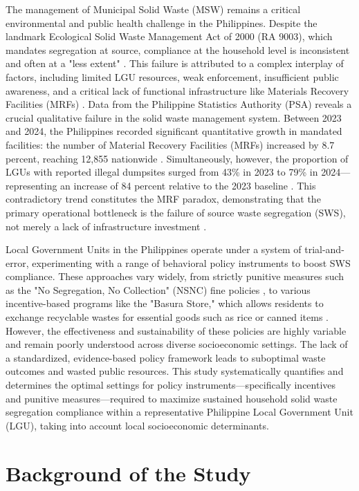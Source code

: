 The management of Municipal Solid Waste (MSW) remains a critical environmental and public health challenge in the Philippines. Despite the landmark Ecological Solid Waste Management Act of 2000 (RA 9003), which mandates segregation at source, compliance at the household level is inconsistent and often at a "less extent" \citep{Carpio2025}. This failure is attributed to a complex interplay of factors, including limited LGU resources, weak enforcement, insufficient public awareness, and a critical lack of functional infrastructure like Materials Recovery Facilities (MRFs) \citep{Espino2025}. Data from the Philippine Statistics Authority (PSA) reveals a crucial qualitative failure in the solid waste management system. Between 2023 and 2024, the Philippines recorded significant quantitative growth in mandated facilities: the number of Material Recovery Facilities (MRFs) increased by 8.7 percent, reaching 12,855 nationwide \citep{PSA2024}. Simultaneously, however, the proportion of LGUs with reported illegal dumpsites surged from 43\% in 2023 to 79\% in 2024—representing an increase of 84 percent relative to the 2023 baseline \citep{PSA2024}. This contradictory trend constitutes the MRF paradox, demonstrating that the primary operational bottleneck is the failure of source waste segregation (SWS), not merely a lack of infrastructure investment \citep{Carpio2025, WorldBank2022}.

Local Government Units in the Philippines operate under a system of trial-and-error, experimenting with a range of behavioral policy instruments to boost SWS compliance. These approaches vary widely, from strictly punitive measures such as the "No Segregation, No Collection" (NSNC) fine policies \citep{Collado2024}, to various incentive-based programs like the "Basura Store," which allows residents to exchange recyclable wastes for essential goods such as rice or canned items \citep{Camarillo2021}. However, the effectiveness and sustainability of these policies are highly variable and remain poorly understood across diverse socioeconomic settings. The lack of a standardized, evidence-based policy framework leads to suboptimal waste outcomes and wasted public resources. This study systematically quantifies and determines the optimal settings for policy instruments—specifically incentives and punitive measures—required to maximize sustained household solid waste segregation compliance within a representative Philippine Local Government Unit (LGU), taking into account local socioeconomic determinants.

\section{Background of the Study}

